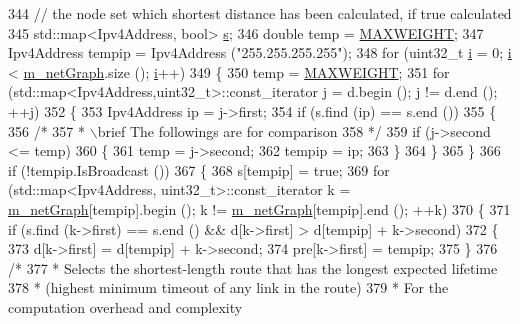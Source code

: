 \begin{DoxyCode}
344   \textcolor{comment}{// the node set which shortest distance has been calculated, if true calculated}
345   std::map<Ipv4Address, bool> \hyperlink{generate__test__data__lte__sinr_8m_ad83eeb3a142285d1243a08c6b7026df8}{s};
346   \textcolor{keywordtype}{double} temp = \hyperlink{dsr-rcache_8h_a667684b091336e57674db9e4480b61b7}{MAXWEIGHT};
347   Ipv4Address tempip = Ipv4Address (\textcolor{stringliteral}{"255.255.255.255"});
348   \textcolor{keywordflow}{for} (uint32\_t \hyperlink{bernuolliDistribution_8m_a6f6ccfcf58b31cb6412107d9d5281426}{i} = 0; \hyperlink{bernuolliDistribution_8m_a6f6ccfcf58b31cb6412107d9d5281426}{i} < \hyperlink{classns3_1_1dsr_1_1DsrRouteCache_a001b3261dc9f91bf3713b73c32206ee6}{m\_netGraph}.size (); \hyperlink{bernuolliDistribution_8m_a6f6ccfcf58b31cb6412107d9d5281426}{i}++)
349     \{
350       temp = \hyperlink{dsr-rcache_8h_a667684b091336e57674db9e4480b61b7}{MAXWEIGHT};
351       \textcolor{keywordflow}{for} (std::map<Ipv4Address,uint32\_t>::const\_iterator j = d.begin (); j != d.end (); ++j)
352         \{
353           Ipv4Address ip = j->first;
354           \textcolor{keywordflow}{if} (s.find (ip) == s.end ())
355             \{
356               \textcolor{comment}{/*}
357 \textcolor{comment}{               * \(\backslash\)brief The followings are for comparison}
358 \textcolor{comment}{               */}
359               \textcolor{keywordflow}{if} (j->second <= temp)
360                 \{
361                   temp = j->second;
362                   tempip = ip;
363                 \}
364             \}
365         \}
366       \textcolor{keywordflow}{if} (!tempip.IsBroadcast ())
367         \{
368           s[tempip] = \textcolor{keyword}{true};
369           \textcolor{keywordflow}{for} (std::map<Ipv4Address, uint32\_t>::const\_iterator k = \hyperlink{classns3_1_1dsr_1_1DsrRouteCache_a001b3261dc9f91bf3713b73c32206ee6}{m\_netGraph}[tempip].begin (); k
       != \hyperlink{classns3_1_1dsr_1_1DsrRouteCache_a001b3261dc9f91bf3713b73c32206ee6}{m\_netGraph}[tempip].end (); ++k)
370             \{
371               \textcolor{keywordflow}{if} (s.find (k->first) == s.end () && d[k->first] > d[tempip] + k->second)
372                 \{
373                   d[k->first] = d[tempip] + k->second;
374                   pre[k->first] = tempip;
375                 \}
376               \textcolor{comment}{/*}
377 \textcolor{comment}{               *  Selects the shortest-length route that has the longest expected lifetime}
378 \textcolor{comment}{               *  (highest minimum timeout of any link in the route)}
379 \textcolor{comment}{               *  For the computation overhead and complexity}

\end{DoxyCode}
